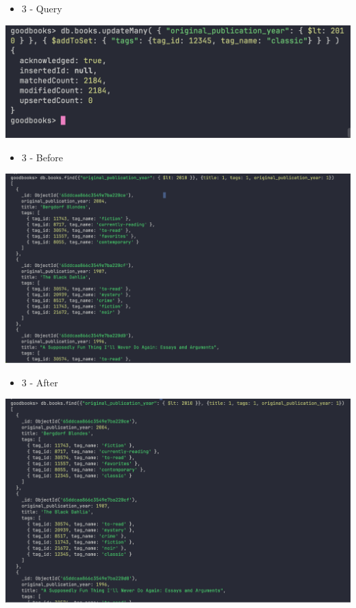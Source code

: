 \documentclass[11pt]{article}
\begin{document}
\begin{itemize}
\item 3 - Query
\end{itemize}
\begin{center}
\includegraphics[width=1\textwidth]{images/KFWJOR001/3-query.png}
\end{center}

\begin{itemize}
\item 3 - Before
\end{itemize}
\begin{center}
\includegraphics[width=1\textwidth]{images/KFWJOR001/3-before.png}
\end{center}

\begin{itemize}
\item 3 - After
\end{itemize}
\begin{center}
\includegraphics[width=1\textwidth]{images/KFWJOR001/3-after.png}
\end{center}
\pagebreak
\end{document}
